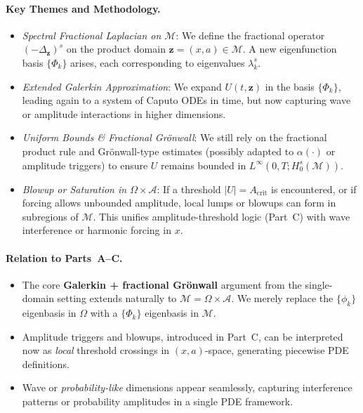 \documentclass[12pt]{article}
\begin{document}
\paragraph{Key Themes and Methodology.}
\begin{itemize}
  \item \emph{Spectral Fractional Laplacian on \(\mathcal{M}\)}: 
    We define the fractional operator $(-\Delta_{\mathbf{z}})^s$ on the product domain 
    \(\mathbf{z}=(x,a)\in \mathcal{M}\). A new eigenfunction basis \(\{\Phi_k\}\) 
    arises, each corresponding to eigenvalues \(\lambda_k^s\).
  \item \emph{Extended Galerkin Approximation}: We expand \(U(t,\mathbf{z})\) in the 
    basis \(\{\Phi_k\}\), leading again to a system of Caputo ODEs in time, but now 
    capturing wave or amplitude interactions in higher dimensions.
  \item \emph{Uniform Bounds \& Fractional Gr\"onwall}: We still rely on the fractional 
    product rule and Gr\"onwall-type estimates (possibly adapted to $\alpha(\cdot)$ 
    or amplitude triggers) to ensure $U$ remains bounded in 
    $L^\infty(0,T;H_0^s(\mathcal{M}))$.
  \item \emph{Blowup or Saturation in \(\Omega\times \mathcal{A}\)}: 
    If a threshold $\lvert U\rvert=A_{\mathrm{crit}}$ is encountered, or if forcing 
    allows unbounded amplitude, local lumps or blowups can form in subregions of 
    $\mathcal{M}$. This unifies amplitude-threshold logic (Part~C) with wave interference 
    or harmonic forcing in $x$.
\end{itemize}

\paragraph{Relation to Parts~A--C.}
\begin{itemize}
    \item The core \textbf{Galerkin + fractional Grönwall} argument from the single-domain 
          setting extends naturally to $\mathcal{M}=\Omega\times \mathcal{A}$. 
          We merely replace the $\{\phi_k\}$ eigenbasis in $\Omega$ with a 
          $\{\Phi_k\}$ eigenbasis in $\mathcal{M}$.
    \item Amplitude triggers and blowups, introduced in Part~C, can be interpreted now 
          as \emph{local} threshold crossings in $(x,a)$-space, generating piecewise PDE 
          definitions. 
    \item Wave or \emph{probability-like} dimensions appear seamlessly, capturing 
          interference patterns or probability amplitudes in a single PDE framework.
\end{itemize}
\end{document}
